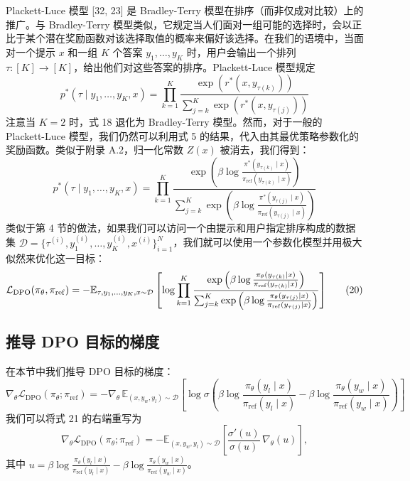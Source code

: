 \documentclass[11pt,UTF8,fontset=fandol]{ctexart}
\newcommand{\sref}{\mathrm{ref}}
\begin{document}
Plackett-Luce 模型 [32, 23] 是 Bradley-Terry 模型在排序（而非仅成对比较）上的推广。与 Bradley-Terry 模型类似，它规定当人们面对一组可能的选择时，会以正比于某个潜在奖励函数对该选择取值的概率来偏好该选择。在我们的语境中，当面对一个提示 $x$ 和一组 $K$ 个答案 $y_1, \ldots, y_K$ 时，用户会输出一个排列 $\tau: [K] \to [K]$，给出他们对这些答案的排序。Plackett-Luce 模型规定
\begin{equation}
p^*(\tau \mid y_1, \ldots, y_K, x) = \prod_{k=1}^{K} \frac{\exp\left(r^*(x, y_{\tau(k)})\right)}{\sum_{j=k}^{K} \exp\left(r^*(x, y_{\tau(j)})\right)} \tag{18}
\end{equation}
注意当 $K = 2$ 时，式 18 退化为 Bradley-Terry 模型。然而，对于一般的 Plackett-Luce 模型，我们仍然可以利用式 5 的结果，代入由其最优策略参数化的奖励函数。类似于附录 A.2，归一化常数 $Z(x)$ 被消去，我们得到：
\begin{equation}
p^*(\tau \mid y_1, \ldots, y_K, x) = \prod_{k=1}^{K} \frac{\exp\left(\beta \log \frac{\pi^*(y_{\tau(k)} \mid x)}{\pi_\sref(y_{\tau(k)} \mid x)}\right)}{\sum_{j=k}^{K} \exp\left(\beta \log \frac{\pi^*(y_{\tau(j)} \mid x)}{\pi_\sref(y_{\tau(j)} \mid x)}\right)} \tag{19}
\end{equation}
类似于第 4 节的做法，如果我们可以访问一个由提示和用户指定排序构成的数据集 $\mathcal{D} = \{\tau^{(i)}, y_1^{(i)}, \ldots, y_K^{(i)}, x^{(i)}\}_{i=1}^N$，我们就可以使用一个参数化模型并用极大似然来优化这一目标：
\begin{equation}
\resizebox{0.95\linewidth}{!}{$\displaystyle
\mathcal{L}_{\mathrm{DPO}}(\pi_\theta, \pi_\sref) = -\mathbb{E}_{\tau, y_1, \ldots, y_K, x \sim \mathcal{D}}\left[\log \prod_{k=1}^{K} \frac{\exp\left(\beta \log \frac{\pi_\theta(y_{\tau(k)} \mid x)}{\pi_\sref(y_{\tau(k)} \mid x)}\right)}{\sum_{j=k}^{K} \exp\left(\beta \log \frac{\pi_\theta(y_{\tau(j)} \mid x)}{\pi_\sref(y_{\tau(j)} \mid x)}\right)}\right]
$} \tag{20}
\end{equation}

\subsection{推导 DPO 目标的梯度}

在本节中我们推导 DPO 目标的梯度：
\begin{equation}
\nabla_\theta \mathcal{L}_{\mathrm{DPO}}(\pi_\theta; \pi_\sref) = -\nabla_\theta\, \mathbb{E}_{(x, y_w, y_l) \sim \mathcal{D}}\left[\log \sigma\left(\beta \log \frac{\pi_\theta(y_l \mid x)}{\pi_\sref(y_l \mid x)} - \beta \log \frac{\pi_\theta(y_w \mid x)}{\pi_\sref(y_w \mid x)}\right)\right] \tag{21}
\end{equation}
我们可以将式 21 的右端重写为
\begin{equation}
\nabla_\theta \mathcal{L}_{\mathrm{DPO}}(\pi_\theta; \pi_\sref) = -\mathbb{E}_{(x, y_w, y_l) \sim \mathcal{D}}\left[\frac{\sigma'(u)}{\sigma(u)}\, \nabla_\theta(u)\right], \tag{22}
\end{equation}
其中 $u = \beta \log \frac{\pi_\theta(y_l \mid x)}{\pi_\sref(y_l \mid x)} - \beta \log \frac{\pi_\theta(y_w \mid x)}{\pi_\sref(y_w \mid x)}$。
\end{document}
